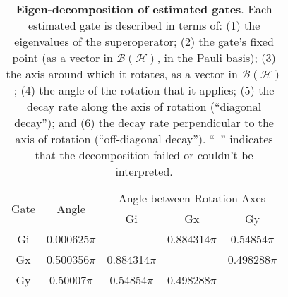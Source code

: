{\begin{table}[h]
\begin{center}
\vspace{2em}
\begin{tabular}[l]{|c|c|c|c|c|}
\hline
\multirow{2}{*}{Gate} & \multirow{2}{*}{Angle} & \multicolumn{3}{c|}{Angle between Rotation Axes} \\ \cline{3-5}
 & & Gi & Gx & Gy \\ \hline
Gi & 0.000625$\pi$ &  & 0.884314$\pi$ & 0.54854$\pi$ \\ \hline
Gx & 0.500356$\pi$ & 0.884314$\pi$ &  & 0.498288$\pi$ \\ \hline
Gy & 0.50007$\pi$ & 0.54854$\pi$ & 0.498288$\pi$ &  \\ \hline
\end{tabular}

\caption{\textbf{Eigen-decomposition of estimated gates}.  Each estimated gate is described in terms of: (1) the eigenvalues of the superoperator; (2) the gate's fixed point (as a vector in $\mathcal{B}(\mathcal{H})$, in the Pauli basis); (3)  the axis around which it rotates, as a vector in $\mathcal{B}(\mathcal{H})$; (4) the angle of the rotation that it applies; (5) the decay rate along the axis of rotation (``diagonal decay''); and (6) the decay rate perpendicular to the axis of rotation (``off-diagonal decay'').  ``--'' indicates that the decomposition failed or couldn't be interpreted. \label{bestCPTPGatesetDecompTable}}
\end{center}
\end{table}


}
